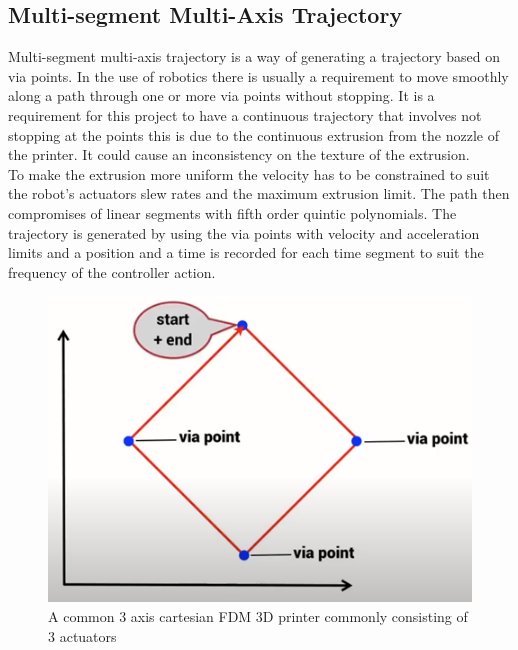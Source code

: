 \documentclass{UoNMCHA}
\numberwithin{equation}{section}
\begin{document}
\subsection{Multi-segment Multi-Axis Trajectory}
Multi-segment multi-axis trajectory is a way of generating a trajectory based on via points. In the use of robotics there is usually a requirement to move smoothly along a path through one or more via points without stopping. It is a requirement for this project to have a continuous trajectory that involves not stopping at the points this is due to the continuous extrusion from the nozzle of the printer. It could cause an inconsistency on the texture of the extrusion. \\
To make the extrusion more uniform the velocity has to be constrained to suit the robot’s actuators slew rates and the maximum extrusion limit. The path then compromises of linear segments with fifth order quintic polynomials. The trajectory is generated by using the via points with velocity and acceleration limits and a position and a time is recorded for each time segment to suit the frequency of the controller action.

\begin{figure}[H]
	\begin{center}
		\includegraphics[width=.5\linewidth]{figs/Picture10}
		\caption{A  common 3 axis cartesian FDM 3D printer commonly consisting of 3 actuators}
		\label{figs/Picture10}
	\end{center}
\end{figure}
\end{document}
